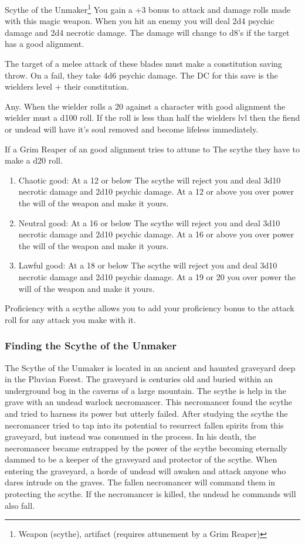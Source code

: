 \begin{commentbox}{Scythe of the Unmaker\footnote{Weapon (scythe), artifact (requires attunement by a Grim Reaper)}}
	You gain a +3 bonus to attack and damage rolls made with this magic weapon. When you hit an enemy you will deal 2d4 psychic damage and 2d4 necrotic damage. The damage will change to d8's if the target has a good alignment.
	
	The target of a melee attack of these blades must make a constitution saving throw. On a fail, they take 4d6 psychic damage. The DC for this save is the wielders level + their constitution.
	
	Any. When the wielder rolls a 20 against a character with good alignment the wielder must a d100 roll. If the roll is less than half the wielders lvl then the fiend or undead will have it's soul removed and become lifeless immediately.
	
	If a Grim Reaper of an good alignment tries to attune to The scythe they have to make a d20 roll. 
	\begin{enumerate}
		\item Chaotic good: At a 12 or below The scythe will reject you and deal 3d10 necrotic damage and 2d10 psychic damage. At a 12 or above you over power the will of the weapon and make it yours.
		\item Neutral good: At a 16 or below The scythe will reject you and deal 3d10 necrotic damage and 2d10 psychic damage. At a 16 or above you over power the will of the weapon and make it yours.
		\item Lawful good: At a 18 or below The scythe will reject you and deal 3d10 necrotic damage and 2d10 psychic damage. At a 19 or 20 you over power the will of the weapon and make it yours.
	\end{enumerate}
	
	Proficiency with a scythe allows you to add your proficiency bonus to the attack roll for any attack you make with it.
\end{commentbox}

\subsubsection{Finding the Scythe of the Unmaker}

The Scythe of the Unmaker is located in an ancient and haunted graveyard deep in the Pluvian Forest. The graveyard is centuries old and buried within an underground bog in the caverns of a large mountain. The scythe is help in the grave with an undead warlock necromancer. This necromancer found the scythe and tried to harness its power but utterly failed. After studying the scythe the necromancer tried to tap into its potential to resurrect fallen spirits from this graveyard, but instead was consumed in the process. In his death, the necromancer became entrapped by the power of the scythe becoming eternally dammed to be a keeper of the graveyard and protector of the scythe. When entering the graveyard, a horde of undead will awaken and attack anyone who dares intrude on the graves. The fallen necromancer will command them in protecting the scythe. If the necromancer is killed, the undead he commands will also fall.

